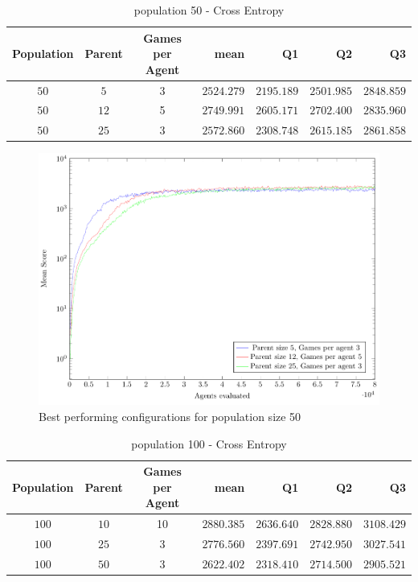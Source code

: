 \clearpage

\begin{table}[H]
\centering
\small
\begin{tabular}{c c c r r r r}
Population & Parent & Games per Agent & mean & Q1 & Q2 & Q3\\
\hline
$50$ & $5$ & 3 & $2524.279$ & $2195.189$ & $2501.985$ & $2848.859$\\
$50$ & $12$ & 5 & $2749.991$ & $2605.171$ & $2702.400$ & $2835.960$\\
$50$ & $25$ & 3 & $2572.860$ & $2308.748$ & $2615.185$ & $2861.858$\\
\end{tabular}
\caption{population 50 - Cross Entropy}
\end{table}

\begin{figure}[H]
\centering
\includegraphics[scale=1]{data/ce_population_offspring/bestofeach_population/50x/PlotFile.pdf}
\caption{Best performing configurations for population size 50}
\end{figure}

\clearpage

\begin{table}[H]
\centering
\small
\begin{tabular}{c c c r r r r}
Population & Parent & Games per Agent & mean & Q1 & Q2 & Q3\\
\hline
$100$ & $10$ & 10 & $2880.385$ & $2636.640$ & $2828.880$ & $3108.429$\\
$100$ & $25$ & 3 & $2776.560$ & $2397.691$ & $2742.950$ & $3027.541$\\
$100$ & $50$ & 3 & $2622.402$ & $2318.410$ & $2714.500$ & $2905.521$\\
\end{tabular}
\caption{population 100 - Cross Entropy}
\end{table}

